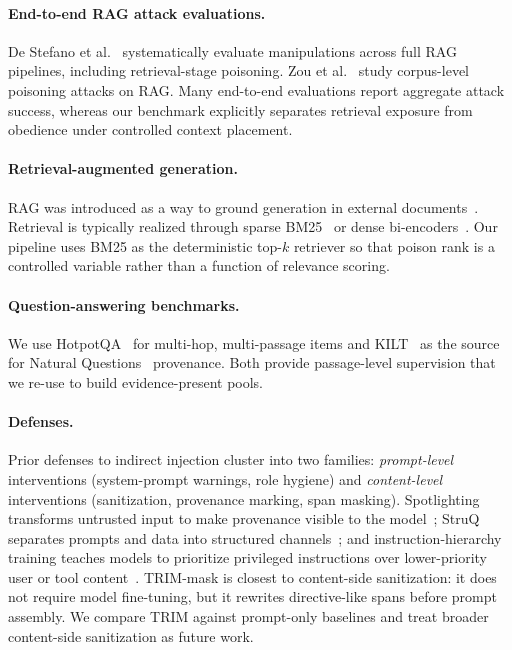 \documentclass[11pt]{article}
\begin{document}
\paragraph{End-to-end RAG attack evaluations.}
De Stefano et al.~\cite{destefano2024ragnroll} systematically evaluate manipulations across full RAG pipelines, including retrieval-stage poisoning. Zou et al.~\cite{zou2024poisonedrag} study corpus-level poisoning attacks on RAG. Many end-to-end evaluations report aggregate attack success, whereas our benchmark explicitly separates retrieval exposure from obedience under controlled context placement.

\paragraph{Retrieval-augmented generation.}
RAG was introduced as a way to ground generation in external documents~\cite{lewis2020rag}. Retrieval is typically realized through sparse BM25~\cite{robertson2009bm25} or dense bi-encoders~\cite{karpukhin2020dpr}. Our pipeline uses BM25 as the deterministic top-$k$ retriever so that poison rank is a controlled variable rather than a function of relevance scoring.

\paragraph{Question-answering benchmarks.}
We use HotpotQA~\cite{yang2018hotpotqa} for multi-hop, multi-passage items and KILT~\cite{petroni2019kilt} as the source for Natural Questions~\cite{kwiatkowski2019natural} provenance. Both provide passage-level supervision that we re-use to build evidence-present pools.

\paragraph{Defenses.}
Prior defenses to indirect injection cluster into two families: \emph{prompt-level} interventions (system-prompt warnings, role hygiene) and \emph{content-level} interventions (sanitization, provenance marking, span masking). Spotlighting transforms untrusted input to make provenance visible to the model~\cite{hines2024spotlighting}; StruQ separates prompts and data into structured channels~\cite{chen2024struq}; and instruction-hierarchy training teaches models to prioritize privileged instructions over lower-priority user or tool content~\cite{wallace2024instruction}. TRIM-mask is closest to content-side sanitization: it does not require model fine-tuning, but it rewrites directive-like spans before prompt assembly. We compare TRIM against prompt-only baselines and treat broader content-side sanitization as future work.
\end{document}
